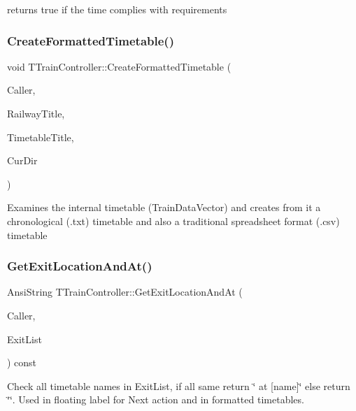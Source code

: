 returns true if the time complies with requirements \mbox{\label{class_t_train_controller_a4ab4b6a568064d27c65f0770e5a5ccd0}} 
\subsubsection{\texorpdfstring{Create\+Formatted\+Timetable()}{CreateFormattedTimetable()}}
{\footnotesize\ttfamily void T\+Train\+Controller\+::\+Create\+Formatted\+Timetable (\begin{DoxyParamCaption}\item[{int}]{Caller,  }\item[{Ansi\+String}]{Railway\+Title,  }\item[{Ansi\+String}]{Timetable\+Title,  }\item[{Ansi\+String}]{Cur\+Dir }\end{DoxyParamCaption})}

Examines the internal timetable (Train\+Data\+Vector) and creates from it a chronological (.txt) timetable and also a traditional spreadsheet format (.csv) timetable \mbox{\label{class_t_train_controller_ae6c904f201d8bb23b3c0714226244890}} 
\subsubsection{\texorpdfstring{Get\+Exit\+Location\+And\+At()}{GetExitLocationAndAt()}}
{\footnotesize\ttfamily Ansi\+String T\+Train\+Controller\+::\+Get\+Exit\+Location\+And\+At (\begin{DoxyParamCaption}\item[{int}]{Caller,  }\item[{T\+Exit\+List \&}]{Exit\+List }\end{DoxyParamCaption}) const}

Check all timetable names in Exit\+List, if all same return \char`\"{} at \mbox{[}name\mbox{]}\char`\"{} else return \char`\"{}\char`\"{}. Used in floating label for Next action and in formatted timetables. \mbox{\label{class_t_train_controller_a61cdbf0085d24c76aa84e7d5e1d11ead}} 
